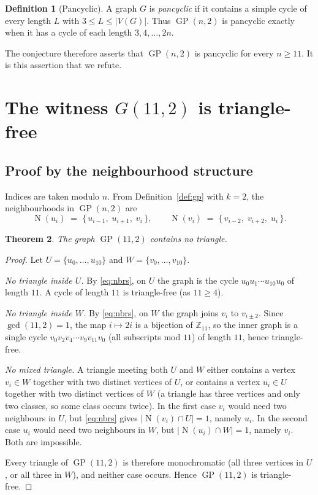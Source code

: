 \documentclass[11pt]{article}
\newtheorem{theorem}{Theorem}
\theoremstyle{definition}
\newtheorem{definition}[theorem]{Definition}
\theoremstyle{remark}
\newcommand{\GP}{\operatorname{GP}}
\newcommand{\Nbr}{\operatorname{N}}
\begin{document}
\begin{definition}[Pancyclic]\label{def:pancyclic}
A graph $G$ is \emph{pancyclic} if it contains a simple cycle of every length
$L$ with $3 \le L \le |V(G)|$. Thus $\GP(n,2)$ is pancyclic exactly when it has
a cycle of each length $3, 4, \dots, 2n$.
\end{definition}

The conjecture therefore asserts that $\GP(n,2)$ is pancyclic for every
$n \ge 11$. It is this assertion that we refute.

\section{The witness $G(11,2)$ is triangle-free}

\subsection{Proof by the neighbourhood structure}

Indices are taken modulo $n$. From Definition~\ref{def:gp} with $k=2$, the
neighbourhoods in $\GP(n,2)$ are
\begin{equation}\label{eq:nbrs}
\Nbr(u_i) \;=\; \{\,u_{i-1},\; u_{i+1},\; v_i\,\},
\qquad
\Nbr(v_i) \;=\; \{\,v_{i-2},\; v_{i+2},\; u_i\,\}.
\end{equation}

\begin{theorem}\label{thm:trifree}
The graph $\GP(11,2)$ contains no triangle.
\end{theorem}

\begin{proof}
Let $U = \{u_0,\dots,u_{10}\}$ and $W = \{v_0,\dots,v_{10}\}$.

\emph{No triangle inside $U$.} By \eqref{eq:nbrs}, on $U$ the graph is the cycle
$u_0 u_1 \cdots u_{10} u_0$ of length $11$. A cycle of length $11$ is triangle-free
(as $11 \ge 4$).

\emph{No triangle inside $W$.} By \eqref{eq:nbrs}, on $W$ the graph joins $v_i$
to $v_{i\pm 2}$. Since $\gcd(11,2) = 1$, the map $i \mapsto 2i$ is a bijection of
$\mathbb{Z}_{11}$, so the inner graph is a single cycle
$v_0 v_2 v_4 \cdots v_{9} v_{11} v_0$ (all subscripts mod $11$) of length $11$,
hence triangle-free.

\emph{No mixed triangle.} A triangle meeting both $U$ and $W$ either contains a
vertex $v_i \in W$ together with two distinct vertices of $U$, or contains a
vertex $u_i \in U$ together with two distinct vertices of $W$ (a triangle has
three vertices and only two classes, so some class occurs twice). In the first
case $v_i$ would need two neighbours in $U$, but \eqref{eq:nbrs} gives
$|\Nbr(v_i) \cap U| = 1$, namely $u_i$. In the second case $u_i$ would need two
neighbours in $W$, but $|\Nbr(u_i) \cap W| = 1$, namely $v_i$. Both are
impossible.

Every triangle of $\GP(11,2)$ is therefore monochromatic (all three vertices in
$U$, or all three in $W$), and neither case occurs. Hence $\GP(11,2)$ is
triangle-free.
\end{proof}
\end{document}

